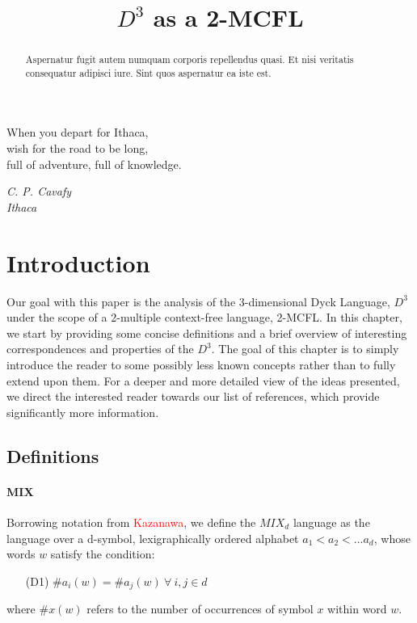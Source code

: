 \documentclass[nonatbib,numbers,10pt]{sigplanconf}
\title{$D^3$ as a 2-MCFL}
\newcommand\todo[1]{\textcolor{red}{#1}}
\begin{document}
\toappear{}

\maketitle

\begin{abstract}
Aspernatur fugit autem numquam corporis repellendus quasi. Et nisi veritatis consequatur adipisci iure. Sint quos aspernatur ea iste est. 
\end{abstract}



\epigraph{When you depart for Ithaca,\\wish for the road to be long,\\full of adventure, full of knowledge.}{\textit{C. P. Cavafy\\ Ithaca}}

\section{Introduction}
Our goal with this paper is the analysis of the 3-dimensional Dyck Language, $D^3$ under the scope of a 2-multiple context-free language, 2-MCFL. In this chapter, we start by providing some concise definitions and a brief overview of interesting correspondences and properties of the $D^3$. The goal of this chapter is to simply introduce the reader to some possibly less known concepts rather than to fully extend upon them. For a deeper and more detailed view of the ideas presented, we direct the interested reader towards our list of references, which provide significantly more information.
\subsection{Definitions}
\paragraph{MIX}
Borrowing notation from \todo{Kazanawa}, we define the $MIX_d$ language as the language over a d-symbol, lexigraphically ordered alphabet $a_1 < a_2 < ... a_d$, whose words $w$ satisfy the condition:
\begin{itemize}
\item[(D1)]  $ \# a_i(w) = \# a_j(w) \ \forall \ i,j \in d $
\end{itemize}
where $ \#x(w)$ refers to the number of occurrences of symbol $x$ within word $w$.
\end{document}
